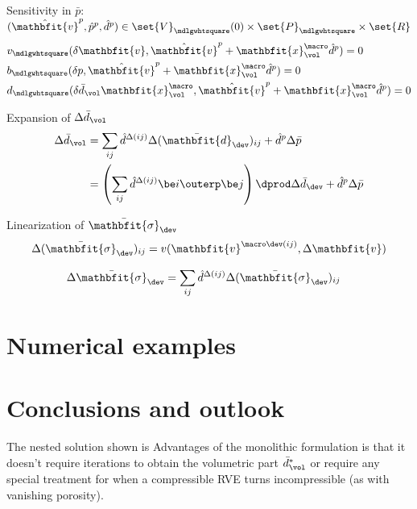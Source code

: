 \documentclass[a4paper,11pt]{article}
\renewcommand{\ta}[1]{\mathbfit{#1}}
\renewcommand{\ts}[1]{\mathbfit{#1}}
\renewcommand{\Box}{\mdlgwhtsquare}
\begin{document}
Sensitivity in $\bar p$: $(\hat{\ta v}^{p}, \hat{p}^{p}, \hat{d}^{p}) \in \set{V}_\Box(0)\times \set{P}_\Box \times\set{R}$
\begin{align}
 &v_\Box(\delta\ta v, \hat{\ta v}^{p}+\ta x^\macro_\vol \hat{d}^{p}) = 0
 \\
 &b_\Box(\delta p,\hat{\ta v}^{p} + \ta x^\macro_\vol \hat{d}^{p}) = 0
 \\
 &d_\Box(\delta\bar{d}_\vol \ta x^\macro_\vol, \hat{\ta v}^{p}+\ta x^\macro_\vol \hat{d}^{p}) = 0
\end{align}

Expansion of $\Delta\bar{d}_\vol$
\begin{align}
 \nonumber \Delta\bar{d}_\vol &= \sum_{ij} \hat{d}^{\Delta(ij)} \Delta(\bar{\ts d}_\dev)_{ij} + \hat{d}^p\Delta\bar{p}\\
 &= \left(\sum_{ij} \hat{d}^{\Delta(ij)} \be i\outerp \be j\right) \dprod \Delta\bar{d}_\dev + \hat{d}^p \Delta\bar{p}
\end{align}

Linearization of $\bar{\ts\sigma}_\dev$
\begin{align}
 \Delta(\bar{\ts\sigma}_\dev)_{ij} = v(\ta v^{\macro\dev(ij)}, \Delta\ta v) 
\end{align}


\begin{align}
  \Delta\bar{\ts\sigma}_\dev &= \sum_{ij} \hat{d}^{\Delta(ij)} \Delta(\bar{\ts\sigma}_\dev)_{ij}
\end{align}



\section{Numerical examples} \label{sec:numerical_examples}

\section{Conclusions and outlook} \label{sec:conclusions}
The nested solution shown is 
Advantages of the monolithic formulation is that it doesn't require iterations to obtain the volumetric part $\bar{d}_\vol^*$ or require any special treatment 
for when a compressible RVE turns incompressible (as with vanishing porosity).
\end{document}

